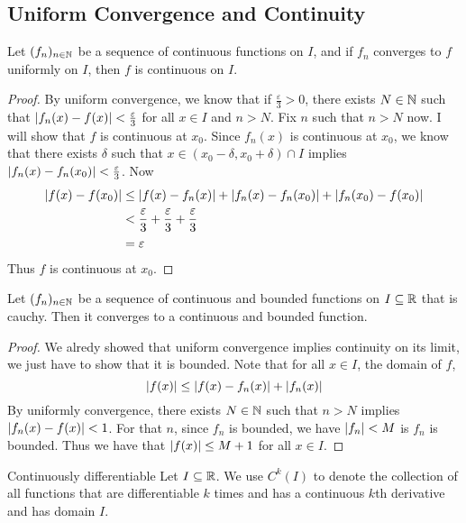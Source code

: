 \documentclass[a4paper]{article}
\begin{document}
\subsection{Uniform Convergence and Continuity}
\begin{thm}{}{} Let $(f_n)_{n\in\mathbb{N}}$ be a sequence of continuous functions on $I$, and if $f_n$ converges to $f$ uniformly on $I$, then $f$ is continuous on $I$. \tcbline
\begin{proof} By uniform convergence, we know that if $\frac{\varepsilon}{3}>0$, there exists $N\in\mathbb{N}$ such that $\abs{f_n(x)-f(x)}<\frac{\varepsilon}{3}$ for all $x\in I$ and $n>N$. Fix $n$ such that $n>N$ now. I will show that $f$ is continuous at $x_0$. Since $f_n(x)$ is continuous at $x_0$, we know that there exists $\delta$ such that $x\in(x_0-\delta,x_0+\delta)\cap I$ implies $\abs{f_n(x)-f_n(x_0)}<\frac{\varepsilon}{3}$. Now
\begin{align*}
\abs{f(x)-f(x_0)}&\leq\abs{f(x)-f_n(x)}+\abs{f_n(x)-f_n(x_0)}+\abs{f_n(x_0)-f(x_0)}\\
&<\frac{\varepsilon}{3}+\frac{\varepsilon}{3}+\frac{\varepsilon}{3}\\
&=\varepsilon
\end{align*}
Thus $f$ is continuous at $x_0$. 
\end{proof}
\end{thm}

\begin{prp}{}{} Let $(f_n)_{n\in\mathbb{N}}$ be a sequence of continuous and bounded functions on $I\subseteq\mathbb{R}$ that is cauchy. Then it converges to a continuous and bounded function. \tcbline
\begin{proof} We alredy showed that uniform convergence implies continuity on its limit, we just have to show that it is bounded. Note that for all $x\in I$, the domain of $f$, $$\abs{f(x)}\leq\abs{f(x)-f_n(x)}+\abs{f_n(x)}$$ By uniformly convergence, there exists $N\in\mathbb{N}$ such that $n>N$ implies $\abs{f_n(x)-f(x)}<1$. For that $n$, since $f_n$ is bounded, we have $\abs{f_n}<M$ is $f_n$ is bounded. Thus we have that $\abs{f(x)}\leq M+1$ for all $x\in I$. 
\end{proof}
\end{prp}

\begin{defn}{Continuously differentiable}{} Let $I\subseteq\mathbb{R}$. We use $C^k(I)$ to denote the collection of all functions that are differentiable $k$ times and has a continuous $k$th derivative and has domain $I$. 
\end{defn}
\end{document}
